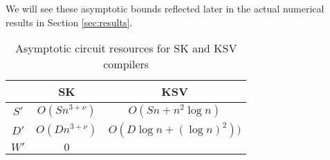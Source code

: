 We will see these asymptotic bounds reflected
later in the actual numerical results in Section \ref{sec:results}.

\begin{center}
\begin{table}
\label{tab:asymptotics}
\begin{tabular}{|c|c|c|}
\hline
   & SK & KSV \\
\hline
$S'$ & $O(Sn^{3+\nu})$ & $O(Sn + n^2 \log n)$\\
$D'$ & $O(Dn^{3+\nu})$ & $O(D \log{n} + (\log{n})^2))$\\ 
$W'$ & $0$             & $$ \\
\hline
\end{tabular}
\caption{Asymptotic circuit resources for SK and KSV compilers}
\end{table}
\end{center}